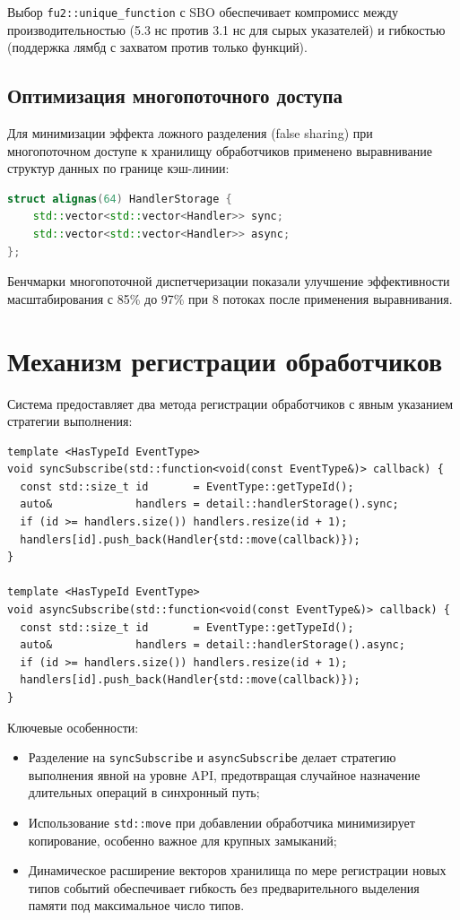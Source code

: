 \documentclass[12pt,a4paper]{report}
\begin{document}
Выбор \texttt{fu2::unique\_function} с SBO обеспечивает компромисс между производительностью (5.3 нс против 3.1 нс для сырых указателей) и гибкостью (поддержка лямбд с захватом против только функций).

\subsection{Оптимизация многопоточного доступа}
Для минимизации эффекта ложного разделения (false sharing) при многопоточном доступе к хранилищу обработчиков применено выравнивание структур данных по границе кэш-линии:

\begin{lstlisting}[caption={Выравнивание структур данных для минимизации false sharing},language=C++]
struct alignas(64) HandlerStorage {
    std::vector<std::vector<Handler>> sync;
    std::vector<std::vector<Handler>> async;
};
\end{lstlisting}

Бенчмарки многопоточной диспетчеризации показали улучшение эффективности масштабирования с 85\% до 97\% при 8 потоках после применения выравнивания.

\section{Механизм регистрации обработчиков}
Система предоставляет два метода регистрации обработчиков с явным указанием стратегии выполнения:

\begin{lstlisting}[caption={Функции регистрации синхронных и асинхронных обработчиков},label=lst:subscribe]
template <HasTypeId EventType>
void syncSubscribe(std::function<void(const EventType&)> callback) {
  const std::size_t id       = EventType::getTypeId();
  auto&             handlers = detail::handlerStorage().sync;
  if (id >= handlers.size()) handlers.resize(id + 1);
  handlers[id].push_back(Handler{std::move(callback)});
}

template <HasTypeId EventType>
void asyncSubscribe(std::function<void(const EventType&)> callback) {
  const std::size_t id       = EventType::getTypeId();
  auto&             handlers = detail::handlerStorage().async;
  if (id >= handlers.size()) handlers.resize(id + 1);
  handlers[id].push_back(Handler{std::move(callback)});
}
\end{lstlisting}

Ключевые особенности:
\begin{itemize}
    \item Разделение на \texttt{syncSubscribe} и \texttt{asyncSubscribe} делает стратегию выполнения явной на уровне API, предотвращая случайное назначение длительных операций в синхронный путь;
    \item Использование \texttt{std::move} при добавлении обработчика минимизирует копирование, особенно важное для крупных замыканий;
    \item Динамическое расширение векторов хранилища по мере регистрации новых типов событий обеспечивает гибкость без предварительного выделения памяти под максимальное число типов.
\end{itemize}
\end{document}
